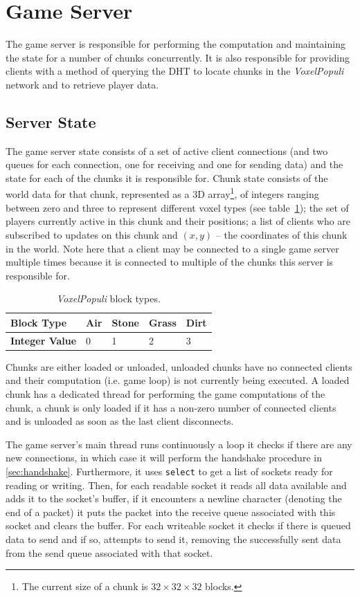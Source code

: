 \documentclass[12pt,notitlepage,a4paper]{report}
\newcommand{\voxpop}{\emph{VoxelPopuli}}
\begin{document}
	\section{Game Server}
	The game server is responsible for performing the computation and maintaining the state for a number of chunks concurrently. It is also responsible for providing clients with a method of querying the DHT to locate chunks in the \voxpop{} network and to retrieve player data.
	
	\subsection{Server State}
	The game server state consists of a set of active client connections (and two queues for each connection, one for receiving and one for sending data) and the state for each of the chunks it is responsible for. Chunk state consists of the world data for that chunk, represented as a 3D array\footnote{The current size of a chunk is $32\times32\times32$ blocks.},  of integers ranging between zero and three to represent different voxel types (see table~\ref{tab:blocks}); the set of players currently active in this chunk and their positions; a list of clients who are subscribed to updates on this chunk and $(x,y)$ -- the coordinates of this chunk in the world. Note here that a client may be connected to a single game server multiple times because it is connected to multiple of the chunks this server is responsible for.
	
	\begin{table}[!ht]
		\centering
		\begin{tabularx}{0.65\textwidth}{| l | l | l | l | X |}
			\hline
			\textbf{Block Type} & Air & Stone & Grass & Dirt \\
			\hline
			\textbf{Integer Value} & 0 & 1 & 2 & 3 \\
			\hline
		\end{tabularx}
		\caption{\voxpop{} block types.}
		\label{tab:blocks}
	\end{table}
	
	Chunks are either loaded or unloaded, unloaded chunks have no connected clients and their computation (i.e. game loop) is not currently being executed. A loaded chunk has a dedicated thread for performing the game computations of the chunk, a chunk is only loaded if it has a non-zero number of connected clients and is unloaded as soon as the last client disconnects.
	
	The game server's main thread runs continuously a loop it checks if there are any new connections, in which case it will perform the handshake procedure in \cref{sec:handshake}. Furthermore, it uses \texttt{select} to get a list of sockets ready for reading or writing. Then, for each readable socket it reads all data available and adds it to the socket's buffer, if it encounters a newline character (denoting the end of a packet) it puts the packet into the receive queue associated with this socket and clears the buffer. For each writeable socket it checks if there is queued data to send and if so, attempts to send it, removing the successfully sent data from the send queue associated with that socket.
	
\end{document}
